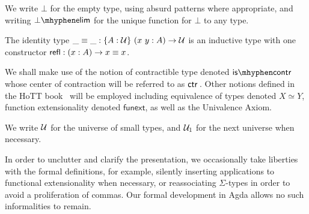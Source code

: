 We write $\bot$ for the empty type, using absurd patterns where
appropriate, and writing $\botelim$ for the unique function for $\bot$
to any type.

The identity type $\_\equiv\_ : \{A : \mathcal{U}\}\ (x\ y : A) \to \mathcal{U}$ is
an inductive type with one constructor
$\mathsf{refl} : (x : A) \to x \equiv x$.

We shall make use of the notion of contractible type denoted
$\iscontr$ whose center of contraction will be referred to as
$\mathsf{ctr}\,$. Other notions defined in the HoTT book~\cite{hottbook} will be
employed including equivalence of types denoted $X \simeq Y$, function
extensionality denoted $\mathsf{funext}$, as well as the Univalence
Axiom.

We write $\mathcal{U}$ for the universe of small types, and $\mathcal{U}_1$ for the
next universe when necessary.

In order to unclutter and clarify the presentation, we
occasionally take liberties with the formal definitions, for example,
silently inserting applications to functional extensionality when
necessary, or reassociating $\Sigma$-types in order to avoid a
proliferation of commas. Our formal development in Agda allows no
such informalities to remain.


